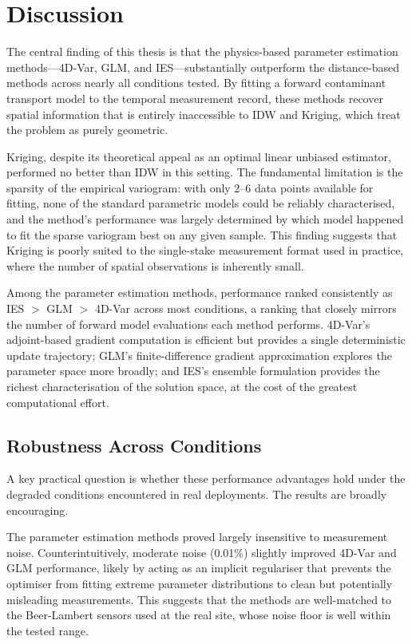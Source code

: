 \label{chapter:conclusions}
\section{Discussion}

The central finding of this thesis is that the physics-based parameter estimation methods---4D-Var, GLM, and IES---substantially outperform the distance-based methods across nearly all conditions tested. By fitting a forward contaminant transport model to the temporal measurement record, these methods recover spatial information that is entirely inaccessible to IDW and Kriging, which treat the problem as purely geometric.

Kriging, despite its theoretical appeal as an optimal linear unbiased estimator, performed no better than IDW in this setting. The fundamental limitation is the sparsity of the empirical variogram: with only 2--6 data points available for fitting, none of the standard parametric models could be reliably characterised, and the method's performance was largely determined by which model happened to fit the sparse variogram best on any given sample. This finding suggests that Kriging is poorly suited to the single-stake measurement format used in practice, where the number of spatial observations is inherently small.

Among the parameter estimation methods, performance ranked consistently as IES $>$ GLM $>$ 4D-Var across most conditions, a ranking that closely mirrors the number of forward model evaluations each method performs. 4D-Var's adjoint-based gradient computation is efficient but provides a single deterministic update trajectory; GLM's finite-difference gradient approximation explores the parameter space more broadly; and IES's ensemble formulation provides the richest characterisation of the solution space, at the cost of the greatest computational effort.

\subsection{Robustness Across Conditions}

A key practical question is whether these performance advantages hold under the degraded conditions encountered in real deployments. The results are broadly encouraging.

The parameter estimation methods proved largely insensitive to measurement noise. Counterintuitively, moderate noise (0.01\%) slightly improved 4D-Var and GLM performance, likely by acting as an implicit regulariser that prevents the optimiser from fitting extreme parameter distributions to clean but potentially misleading measurements. This suggests that the methods are well-matched to the Beer-Lambert sensors used at the real site, whose noise floor is well within the tested range.

